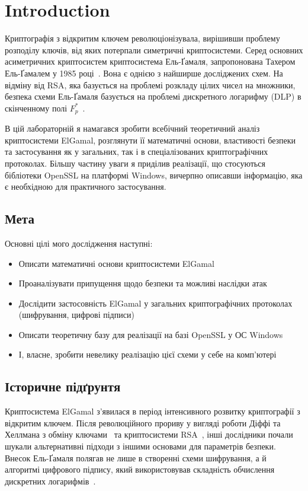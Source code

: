 \section{Introduction}

Криптографія з відкритим ключем революціонізувала, вирішивши проблему розподілу ключів, від яких потерпали 
симетричні криптосистеми. Серед основних асиметричних криптосистем криптосистема Ель-Ґамаля, запропонована Тахером 
Ель-Ґамалем у 1985 році~\cite{elgamal1985public}. Вона є однією з найширше досліджених схем. На відміну від RSA, 
яка базується на проблемі розкладу цілих чисел на множники, безпека схеми Ель-Ґамаля базується на проблемі дискретного 
логарифму (DLP) в скінченному полі $F_{p}^{*}$~\cite{menezes1996handbook}.

В цій лабораторній я намагався зробити всебічний теоретичний аналіз криптосистеми ElGamal, розглянути її математичні 
основи, властивості безпеки та застосування як у загальних, так і в спеціалізованих криптографічних протоколах.
Більшу частину уваги я приділив реалізації, що стосуються бібліотеки OpenSSL на платформі Windows, вичерпно описавши 
інформацію, яка є необхідною для практичного застосування.

\subsection{Мета}

Основні цілі мого дослідження наступні:
\begin{itemize}
    \item Описати математичні основи криптосистеми ElGamal
    \item Проаналізувати припущення щодо безпеки та можливі наслідки атак
    \item Дослідити застосовність ElGamal у загальних криптографічних протоколах (шифрування, цифрові підписи)
    \item Описати теоретичну базу для реалізації на базі OpenSSL у ОС Windows
    \item І, власне, зробити невелику реалізацію цієї схеми у себе на комп'ютері
\end{itemize}

\subsection{Історичне підґрунтя}

Криптосистема ElGamal з'явилася в період інтенсивного розвитку криптографії з відкритим ключем. Після революційного прориву 
у вигляді роботи Діффі та Хеллмана з обміну ключами~\cite{diffie1976new} та криптосистеми RSA~\cite{rivest1978method}, 
інші дослідники почали шукали альтернативні підходи з іншими основами для параметрів безпеки. Внесок Ель-Ґамаля полягав не 
лише в створенні схеми шифрування, а й алгоритмі цифрового підпису, який використовував складність обчислення дискретних 
логарифмів~\cite{elgamal1985public}.

